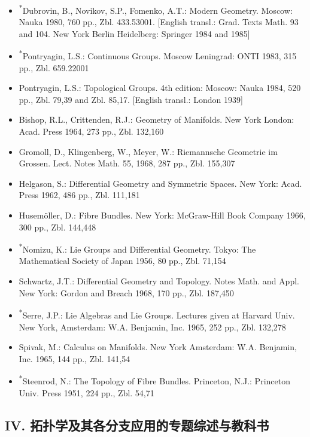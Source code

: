 \begin{itemize}
\item \textsuperscript{*}Dubrovin, B., Novikov, S.P., Fomenko, A.T.: Modern Geometry. Moscow: Nauka 1980, 760 pp., Zbl. 433.53001. [English transl.: Grad. Texts Math. 93 and 104. New York Berlin Heidelberg: Springer 1984 and 1985]
\item \textsuperscript{*}Pontryagin, L.S.: Continuous Groups. Moscow Leningrad: ONTI 1983, 315 pp., Zbl. 659.22001
\item Pontryagin, L.S.: Topological Groups. 4th edition: Moscow: Nauka 1984, 520 pp., Zbl. 79,39 and Zbl. 85,17. [English transl.: London 1939]
\item Bishop, R.L., Crittenden, R.J.: Geometry of Manifolds. New York London: Acad. Press 1964, 273 pp., Zbl. 132,160
\item Gromoll, D., Klingenberg, W., Meyer, W.: Riemannsche Geometrie im Grossen. Lect. Notes Math. 55, 1968, 287 pp., Zbl. 155,307
\item Helgason, S.: Differential Geometry and Symmetric Spaces. New York: Acad. Press 1962, 486 pp., Zbl. 111,181
\item Husemöller, D.: Fibre Bundles. New York: McGraw-Hill Book Company 1966, 300 pp., Zbl. 144,448
\item \textsuperscript{*}Nomizu, K.: Lie Groups and Differential Geometry. Tokyo: The Mathematical Society of Japan 1956, 80 pp., Zbl. 71,154


\item Schwartz, J.T.: Differential Geometry and Topology. Notes Math. and Appl. New York: Gordon and Breach 1968, 170 pp., Zbl. 187,450
\item \textsuperscript{*}Serre, J.P.: Lie Algebras and Lie Groups. Lectures given at Harvard Univ. New York, Amsterdam: W.A. Benjamin, Inc. 1965, 252 pp., Zbl. 132,278
\item Spivak, M.: Calculus on Manifolds. New York Amsterdam: W.A. Benjamin, Inc. 1965, 144 pp., Zbl. 141,54
\item \textsuperscript{*}Steenrod, N.: The Topology of Fibre Bundles. Princeton, N.J.: Princeton Univ. Press 1951, 224 pp., Zbl. 54,71
\end{itemize}

\subsection*{IV. 拓扑学及其各分支应用的专题综述与教科书}


